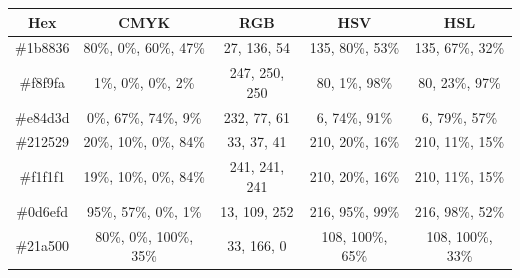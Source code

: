 \begin{tabular}{|c|c|c|c|c|}
	\hline
	Hex & CMYK & RGB & HSV & HSL \\
	\hline
	\#1b8836 & 80\%, 0\%, 60\%, 47\% & 27, 136, 54 & 135, 80\%, 53\% & 135, 67\%, 32\%  \\
	\hline 
	\#f8f9fa & 1\%, 0\%, 0\%, 2\% & 247, 250, 250 & 80, 1\%, 98\% & 80, 23\%, 97\% \\
	\hline
	\#e84d3d & 0\%, 67\%, 74\%, 9\% & 232, 77, 61 & 6, 74\%, 91\% & 6, 79\%, 57\% \\
	\hline
	\#212529 & 20\%, 10\%, 0\%, 84\% & 33, 37, 41 & 210, 20\%, 16\% & 210, 11\%, 15\% \\
	\hline
	\#f1f1f1 & 19\%, 10\%, 0\%, 84\% & 241, 241, 241 & 210, 20\%, 16\% & 210, 11\%, 15\% \\
	\hline
	\#0d6efd & 95\%, 57\%, 0\%, 1\% & 13, 109, 252 & 216, 95\%, 99\% & 216, 98\%, 52\% \\
	\hline
	\#21a500 & 80\%, 0\%, 100\%, 35\% & 33, 166, 0 & 108, 100\%, 65\% & 108, 100\%, 33\% \\
	\hline
	
	
\end{tabular}

